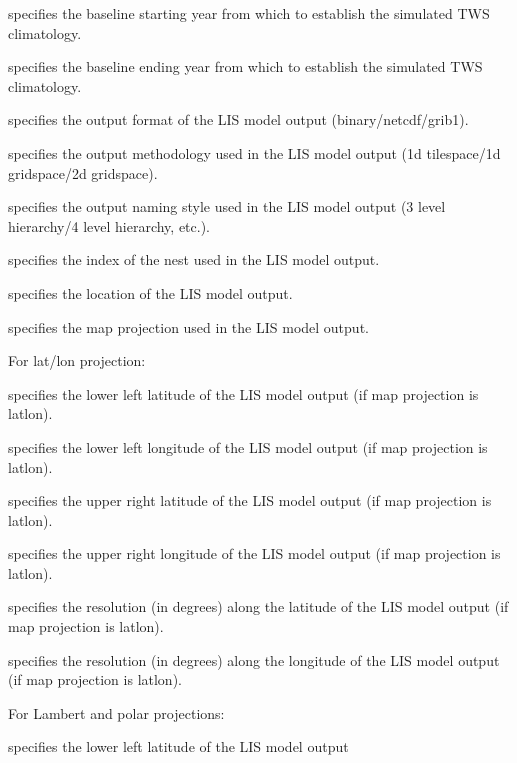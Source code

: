  specifies the baseline starting year from which to establish the 
 simulated TWS climatology.

 specifies the baseline ending year from which to establish the
 simulated TWS climatology.

 specifies the output format of the LIS model output
 (binary/netcdf/grib1).

 specifies the output methodology used in the LIS model output
 (1d tilespace/1d gridspace/2d gridspace).

 specifies the output naming style used in the LIS model output 
 (3 level hierarchy/4 level hierarchy, etc.).

 specifies the index of the nest used in the LIS model output.

 specifies the location of the LIS model output.

 specifies the map projection used in the LIS model output.

 For lat/lon projection:

 specifies the lower left latitude of the LIS model output
 (if map projection is latlon).

 specifies the lower left longitude of the LIS model output
 (if map projection is latlon).

 specifies the upper right latitude of the LIS model output
 (if map projection is latlon).

 specifies the upper right longitude of the LIS model output
 (if map projection is latlon).

 specifies the resolution (in degrees) along the latitude of the
 LIS model output (if map projection is latlon).

 specifies the resolution (in degrees) along the longitude of the
 LIS model output (if map projection is latlon).

 For Lambert and polar projections:

 specifies the lower left latitude of the LIS model output

